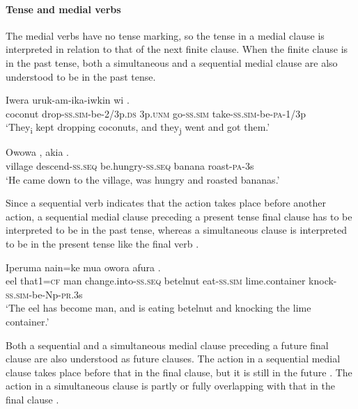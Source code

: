 \paragraph{Tense and medial verbs}
{}
The medial verbs have no tense marking, so the tense in a medial clause is interpreted in relation to that of the next finite clause. When the finite clause is in the past tense, both a simultaneous  and a sequential medial clause  are also understood to be in the past tense.

\ea%
\label{ex:3:x1025}
\gll Iwera uruk-am-ika-iwkin wi  .\\
coconut drop-\textsc{ss}.\textsc{sim}-be-2/3p.\textsc{ds} 3p.\textsc{unm} go-\textsc{ss}.\textsc{sim} take-\textsc{ss}.\textsc{sim}-be-\textsc{pa}-1/3p\\
\glt`They\textsubscript{i} kept dropping coconuts, and they\textsubscript{j} went and got them.'
\z

\ea%
\label{ex:3:x1023}
\gll Owowa  , akia . \\
village descend-\textsc{ss}.\textsc{seq} be.hungry-\textsc{ss}.\textsc{seq} banana roast-\textsc{pa}-3s\\
\glt`He came down to the village, was hungry and roasted bananas.'
\z

Since a sequential verb indicates that the action takes place before another action, a sequential medial clause preceding a present tense final clause has to be interpreted to be in the past tense, whereas a simultaneous clause is interpreted to be in the present tense like the final verb .

\ea%
\label{ex:3:x1024}
\gll Iperuma nain=ke mua  owora  afura .\\
eel that1=\textsc{cf} man change.into-\textsc{ss}.\textsc{seq} betelnut eat-\textsc{ss}.\textsc{sim} lime.container knock-\textsc{ss}.\textsc{sim}-be-Np-\textsc{pr}.3s\\
\glt`The eel has become man, and is eating betelnut and knocking the lime container.'
\z

Both a sequential and a simultaneous medial clause preceding a future final clause are also understood as future clauses. The action in a sequential medial clause takes place before that in the final clause, but it is still in the future . The action in a simultaneous clause is partly or fully overlapping with that in the final clause .

